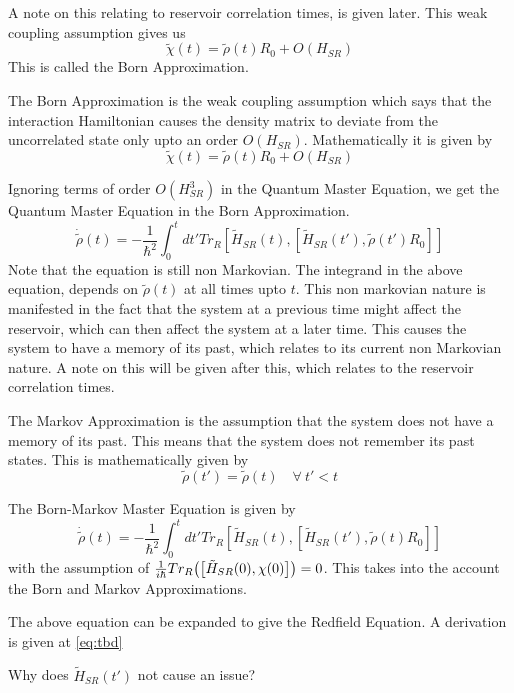 \documentclass{scrartcl}
\newcommand{\1}{\mathbbm{1}}
\newcommand{\ihsr}{\tilde{H}_{SR}}
\begin{document}
A note on this relating to reservoir correlation times, is given later.
This weak coupling assumption gives us 
\begin{equation*}
    \tilde{\chi}(t) = \tilde{\rho}(t) R_0  + O(H_{SR})  
\end{equation*}
This is called the Born Approximation.
\begin{definition}
    The Born Approximation is the weak coupling assumption which says that the interaction Hamiltonian
    causes the density matrix to deviate from the uncorrelated state only upto an order $O(H_{SR})$.
    Mathematically it is given by 
    \begin{equation}
        \tilde{\chi}(t) = \tilde{\rho}(t) R_0  + O(H_{SR})  
    \end{equation}
\end{definition}
Ignoring terms of order $O(H_{SR}^3)$ in the Quantum Master Equation, we get the Quantum Master Equation in the Born Approximation.
\begin{equation}
    \dot{\tilde{\rho}}(t) = -\frac{1}{\hbar^2} \int_0^t dt' Tr_R[\tilde{H}_{SR}(t), [\tilde{H}_{SR}(t'), \tilde{\rho}(t')R_0]]
\end{equation}
Note that the equation is still non Markovian. The integrand in the above equation, depends on $\tilde{\rho}(t)$ at all times upto $t$.
This non markovian nature is manifested in the fact that the system at a previous time might affect the reservoir, which
can then affect the system at a later time. This causes the system to have a memory of its past, which relates to its current non Markovian nature. 
A note on this will be given after this, which relates to the reservoir correlation times.
\begin{definition}
    The Markov Approximation is the assumption that the system does not have a memory of its past. This means that the system
    does not remember its past states. This is mathematically given by 
    \begin{equation}
        \tilde{\rho}(t') = \tilde{\rho}(t) \quad \forall ~ t' < t
    \end{equation}
    
\end{definition}
\begin{definition}
    The Born-Markov Master Equation is given by 
    \begin{equation}
        \dot{\tilde{\rho}}(t) = -\frac{1}{\hbar^2} \int_0^t dt' Tr_R[\tilde{H}_{SR}(t), [\tilde{H}_{SR}(t'), \tilde{\rho}(t)R_0]]
    \end{equation}
    with the assumption of $\frac{1}{i\hbar} Tr_R\qty(\qty[\tilde{H}_{SR}(0),\chi (0)]) = 0$. This takes into the account the 
    Born and Markov Approximations.
\end{definition}
The above equation can be expanded to give the Redfield Equation. A derivation is given at \cref{eq:tbd}
\begin{remark}
    Why does $\ihsr (t')$ not cause an issue?
\end{remark}
\end{document}
